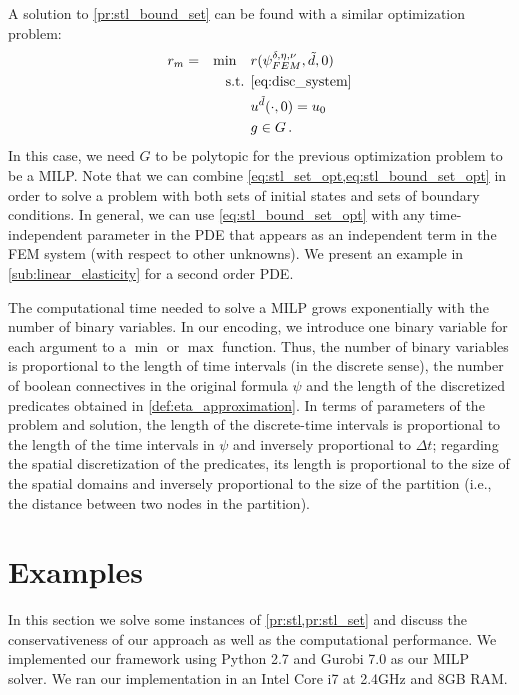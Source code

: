 \documentclass[letterpaper, 10 pt, conference]{ieeeconf/ieeeconf}
\begin{document}
A solution to \cref{pr:stl_bound_set} can be found with a similar optimization
problem:
%
\begin{equation}
    \label{eq:stl_bound_set_opt}
    \begin{aligned}
        &r_m = &\min \quad &r(\psi^{\delta, \eta, \nu}_{FEM}, \tilde{d}, 0) \\
        &  &\text{s.t. } &\cref{eq:disc_system} \\
        &  & &u^{\tilde{d}}(\cdot, 0) = u_0 \\
        &  & &g \in G \,.
    \end{aligned}
\end{equation}
%
In this case, we need $G$ to be polytopic for the previous optimization problem
to be a MILP. Note that we can combine \cref{eq:stl_set_opt,eq:stl_bound_set_opt} in order to
solve a problem with both sets of initial states and sets of boundary
conditions. In general, we can use \cref{eq:stl_bound_set_opt} with any time-independent 
parameter in the PDE that appears
as an independent term in the FEM system (with respect to other unknowns). We
present an example in \cref{sub:linear_elasticity} for a second order PDE.

The computational time needed to solve a MILP grows exponentially with 
the number of binary variables. In our encoding, we introduce one
binary variable for each argument to a $\min$ or $\max$ function. Thus, the
number of binary variables is proportional to the length of time intervals (in
the discrete sense), the number of boolean connectives in the original formula
$\psi$ and the length of the discretized predicates obtained in
\cref{def:eta_approximation}. In terms of parameters of the problem and solution,
the length of the discrete-time intervals is proportional to the length of the time
intervals in $\psi$ and inversely proportional to $\Delta t$; regarding the
spatial discretization of the predicates, its length is proportional to the size
of the spatial domains and inversely proportional to the size of the partition
(i.e., the distance between two nodes in the partition).

\section{Examples}
\label{sec:examples}

In this section we solve some instances of \cref{pr:stl,pr:stl_set} and discuss
the conservativeness of our approach as well as the computational performance.
We implemented our framework using Python 2.7 and Gurobi 7.0 as our MILP solver.
We ran our implementation in an Intel Core i7 at 2.4GHz and 8GB RAM.
\end{document}
